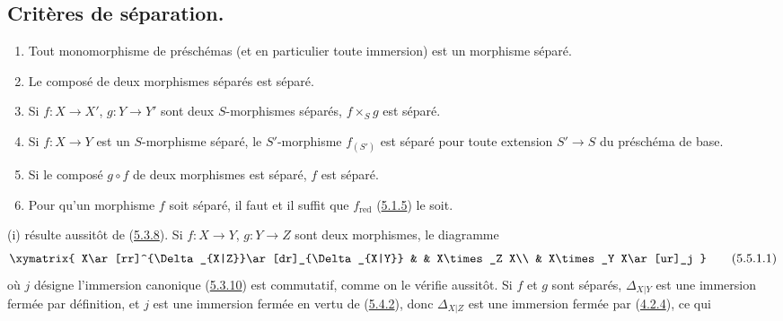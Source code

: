 \subsection{Critères de séparation.}
\label{subsection:I.5.5-fr}

\begin{proposition}[5.5.1]
\label{I.5.5.1-fr}
\begin{enumerate}
  \item[\rm(i)] Tout monomorphisme de préschémas (et en particulier toute
    immersion) est un morphisme séparé.
  \item[\rm(ii)] Le composé de deux morphismes séparés est séparé.
  \item[\rm(iii)] Si $f:X\to X'$, $g:Y\to Y'$ sont deux $S$-morphismes
    séparés, $f\times_S g$ est séparé.
  \item[\rm(iv)] Si $f:X\to Y$ est un $S$-morphisme séparé, le
    $S'$-morphisme $f_{(S')}$ est séparé pour toute extension $S'\to S$ du
    préschéma de base.
  \item[\rm(v)] Si le composé $g\circ f$ de deux morphismes est séparé, $f$
    est séparé.
  \item[\rm(vi)] Pour qu'un morphisme $f$ soit séparé, il faut et il suffit
    que $f_{\mathrm{red}}$ (\hyperref[I.5.1.5-fr]{5.1.5}) le soit.
\end{enumerate}
\end{proposition}

(i) résulte aussitôt de (\hyperref[I.5.3.8-fr]{5.3.8}). Si $f:X\to Y$,
$g:Y\to Z$ sont deux morphismes, le diagramme
\[
  \xymatrix{
    X\ar[rr]^{\Delta_{X|Z}}\ar[dr]_{\Delta_{X|Y}} & &
    X\times_Z X\\
    & X\times_Y X\ar[ur]_j
  }
  \tag{5.5.1.1}\label{I.5.5.1.1-fr}
\]
où $j$ désigne l'immersion canonique (\hyperref[I.5.3.10-fr]{5.3.10}) est
commutatif, comme on le vérifie aussitôt. Si $f$ et $g$ sont séparés,
$\Delta_{X|Y}$ est une immersion fermée par définition, et $j$ est une
immersion fermée en vertu de (\hyperref[I.5.4.2-fr]{5.4.2}), donc
$\Delta_{X|Z}$ est une immersion fermée par
(\hyperref[I.4.2.4-fr]{4.2.4}), ce qui

